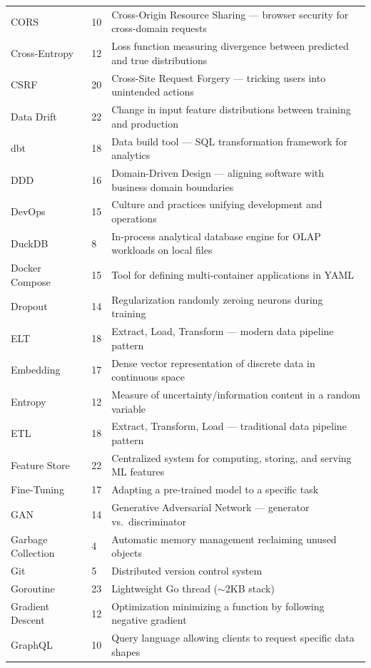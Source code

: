 \documentclass[11pt, a4paper, oneside]{report}
\begin{document}
{{{{{{{{{\begin{longtable}{L{0.22\textwidth} L{0.08\textwidth} L{0.60\textwidth}}
CORS & 10 & Cross-Origin Resource Sharing --- browser security for cross-domain requests \\
Cross-Entropy & 12 & Loss function measuring divergence between predicted and true distributions \\
CSRF & 20 & Cross-Site Request Forgery --- tricking users into unintended actions \\
Data Drift & 22 & Change in input feature distributions between training and production \\
dbt & 18 & Data build tool --- SQL transformation framework for analytics \\
DDD & 16 & Domain-Driven Design --- aligning software with business domain boundaries \\
DevOps & 15 & Culture and practices unifying development and operations \\
DuckDB & 8 & In-process analytical database engine for OLAP workloads on local files \\
Docker Compose & 15 & Tool for defining multi-container applications in YAML \\
Dropout & 14 & Regularization randomly zeroing neurons during training \\
ELT & 18 & Extract, Load, Transform --- modern data pipeline pattern \\
Embedding & 17 & Dense vector representation of discrete data in continuous space \\
Entropy & 12 & Measure of uncertainty/information content in a random variable \\
ETL & 18 & Extract, Transform, Load --- traditional data pipeline pattern \\
Feature Store & 22 & Centralized system for computing, storing, and serving ML features \\
Fine-Tuning & 17 & Adapting a pre-trained model to a specific task \\
GAN & 14 & Generative Adversarial Network --- generator vs.\ discriminator \\
Garbage Collection & 4 & Automatic memory management reclaiming unused objects \\
Git & 5 & Distributed version control system \\
Goroutine & 23 & Lightweight Go thread ($\sim$2KB stack) \\
Gradient Descent & 12 & Optimization minimizing a function by following negative gradient \\
GraphQL & 10 & Query language allowing clients to request specific data shapes \\

\end{longtable}}}}}}}}}}
\end{document}
